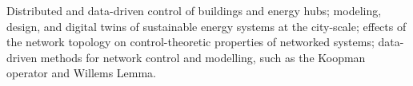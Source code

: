 
\vspace{0.8cm}

  Distributed and data-driven control of buildings and energy hubs; 
  modeling, design, and digital twins of sustainable energy systems at the city-scale;
  effects of the network topology on control-theoretic properties of networked systems; 
  data-driven methods for network control and modelling, such as the Koopman operator and Willems Lemma.


\begin{tabular}{p{} p{}}


\end{tabular}

